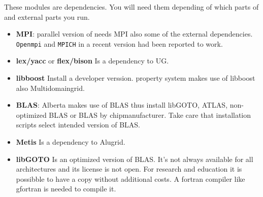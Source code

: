 These modules are dependencies. You will need them depending of which parts of \Dune and external parts you run.
\begin{itemize}
\item \textbf{MPI}: parallel version of \Dune needs MPI also some of the external dependencies. \texttt{Openmpi} and \texttt{MPICH} in a recent version had been reported to work. 

\item \textbf{lex/yacc} or \textbf{flex/bison} Is a dependency to UG.

\item \textbf{libboost} Install a developer verssion. \Dumux property system makes use of libboost also \Dune Multidomaingrid.

\item \textbf{BLAS}: Alberta makes use of BLAS thus install libGOTO, ATLAS, non-optimized BLAS or BLAS by chipmanufacturer. Take care that installation scripts select intended version of BLAS. 

\item \textbf{Metis} Is a dependency to Alugrid.
\item \textbf{libGOTO} Is an optimized version of BLAS. It's not always available for all architectures and 
its license is not open. For research and education it is possibble to have a copy without additional costs.
A fortran compiler like gfortran is needed to compile it.
\end{itemize}


